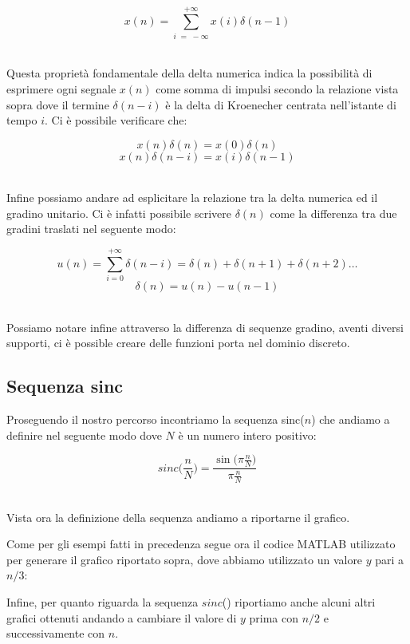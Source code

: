 \documentclass[../main.tex]{subfiles}
\begin{document}
\begin{prop*}\

\[x(n) = \sum_{i\;=\;-\infty}^{+\infty} x(i) \delta(n-1)\]\
	
\end{prop*}

Questa proprietà fondamentale della delta numerica indica la possibilità di esprimere ogni segnale $x(n)$ come somma di impulsi secondo la relazione vista sopra dove il termine $\delta(n-i)$ è la delta di Kroenecher centrata nell’istante di tempo $i$.
Ci è possibile verificare che:

\[ x(n) \delta(n) = x(0)\delta(n) \]
\[ x(n) \delta(n-i) = x(i)\delta(n-1) \]\

Infine possiamo andare ad esplicitare la relazione tra la delta numerica ed il gradino unitario. Ci è infatti possibile scrivere $\delta(n)$ come la differenza tra due gradini traslati nel seguente modo:

\[ u(n) = \sum_{i = 0}^{+\infty} \delta(n-i) = \delta(n) + \delta(n+1) + \delta(n+2) \dots \]
\[ \delta(n) = u(n) - u(n-1) \]\

Possiamo notare infine attraverso la differenza di sequenze gradino, aventi diversi supporti, ci è possible creare delle funzioni porta nel dominio discreto.

\subsection{Sequenza sinc}

Proseguendo il nostro percorso incontriamo la sequenza sinc($n$) che andiamo a definire nel seguente modo dove $N$ è un numero intero positivo:

\[ \unit{sinc}\bigg(\frac{n}{N}\bigg) =  \frac{\sin\big(\pi \frac{n}{N}\big)}{\pi \frac{n}{N}}\]\

Vista ora la definizione della sequenza andiamo a riportarne il grafico.


Come per gli esempi fatti in precedenza segue ora il codice MATLAB utilizzato per generare il grafico riportato sopra, dove abbiamo utilizzato un valore $y$ pari a $n/3$:



Infine, per quanto riguarda la sequenza $sinc$() riportiamo anche alcuni altri grafici ottenuti andando a cambiare il valore di $y$ prima con $n/2$ e successivamente con $n$. 
\end{document}
